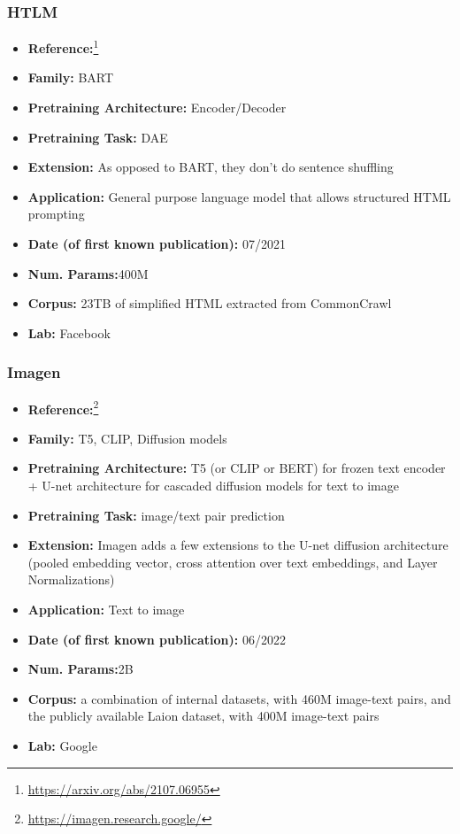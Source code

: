 \documentclass{article}
\begin{document}
\subsubsection{HTLM}

            \begin{itemize}
                \item \textbf{Reference:}\footnote{\url{https://arxiv.org/abs/2107.06955}}\cite{aghajanyan2021htlm}
                \item \textbf{Family:} BART 
                \item \textbf{Pretraining Architecture:} Encoder/Decoder
                \item \textbf{Pretraining Task:} DAE
                \item \textbf{Extension:} As opposed to BART, they don’t do sentence shuffling  
                \item \textbf{Application:} General purpose language model that allows structured HTML prompting 
                \item \textbf{Date (of first known publication):} 07/2021
                \item \textbf{Num. Params:}400M
                \item \textbf{Corpus:} 23TB of simplified HTML extracted from CommonCrawl
                \item \textbf{Lab:} Facebook
            \end{itemize}

\subsubsection{Imagen}

            \begin{itemize}
                \item \textbf{Reference:}\footnote{\url{https://imagen.research.google/}}\cite{saharia2022photorealistic}
                \item \textbf{Family:} T5, CLIP, Diffusion models 
                \item \textbf{Pretraining Architecture:} T5 (or CLIP or BERT) for frozen text encoder + U-net architecture for cascaded diffusion models for text to image
                \item \textbf{Pretraining Task:} image/text pair prediction
                \item \textbf{Extension:} Imagen adds a few extensions to the U-net diffusion architecture (pooled embedding vector, cross attention over text embeddings, and Layer Normalizations)  
                \item \textbf{Application:} Text to image
                \item \textbf{Date (of first known publication):} 06/2022
                \item \textbf{Num. Params:}2B
                \item \textbf{Corpus:} a combination of internal datasets, with 460M image-text pairs, and the publicly available Laion dataset, with 400M image-text pairs
                \item \textbf{Lab:} Google
            \end{itemize}
            
\end{document}

